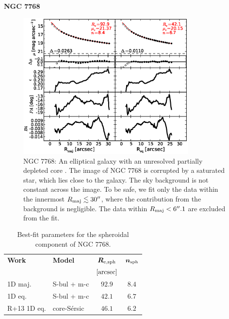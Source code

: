 \documentclass[preprint2]{emulateapj}
\newcommand{\fitfigurewidth}{0.8\textwidth}
\begin{document}
  \clearpage\newpage\noindent
  {\bf NGC 7768 \\}

  \begin{figure}[h]
  \begin{center}
  \includegraphics[width=\fitfigurewidth]{n7768_1Dfit.eps}
  \caption{NGC 7768: 
  An elliptical galaxy with an unresolved partially depleted core \citep{rusli2013}. %
  The image of NGC 7768 is corrupted by a saturated star, which lies close to the galaxy.
  The sky background is not constant across the image.
  To be safe, we fit only the data within the innermost $R_{\rm maj} \lesssim 30''$, where the contribution from the background is negligible.
  The data within $R_{\rm maj} < 6''.1$ are excluded from the fit.
  }
  \end{center}
  \end{figure}

  \begin{table}[h]
  \small
  \caption{Best-fit parameters for the spheroidal component of NGC 7768.}
  \begin{center}
  \begin{tabular}{llcc}
  \hline
  {\bf Work} & {\bf Model}   & $\bm R_{\rm e,sph}$    & $\bm n_{\rm sph}$ \\
    &  &  $[\rm arcsec]$ & \\
  \hline
  1D maj. & S-bul + m-c & $92.9$  &  $8.4$ \\
  1D eq.  & S-bul + m-c & $42.1$  &  $6.7$ \\
  \hline
  R+13 1D eq.      & core-S\'ersic & $46.1$  &  $6.2$ \\
  \hline
  \end{tabular}
  \end{center}
  \label{tab:n7768}
  \end{table}
   
\end{document}
